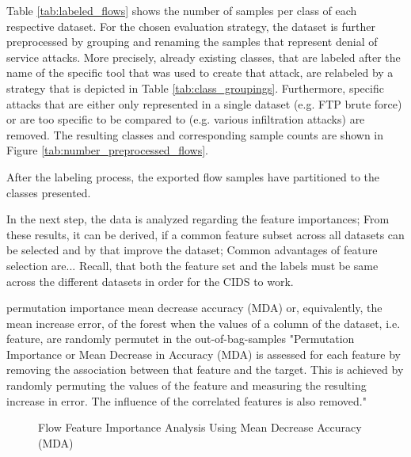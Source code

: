 \documentclass[../../main.tex]{subfiles}
\begin{document}
Table \ref{tab:labeled_flows} shows the number of samples per class of each respective dataset. For the chosen evaluation strategy, the dataset is further preprocessed by grouping and renaming the samples that represent denial of service attacks. More precisely, already existing classes, that are labeled after the name of the specific tool that was used to create that attack, are relabeled by a strategy that is depicted in Table \ref{tab:class_groupings}. Furthermore, specific attacks that are either only represented in a single dataset (e.g. FTP brute force) or are too specific to be compared to (e.g. various infiltration attacks) are removed. The resulting classes and corresponding sample counts are shown in Figure \ref{tab:number_preprocessed_flows}. 



\begin{table}
    \footnotesize
    \centering
    \setlength{\extrarowheight}{0pt}
    \addtolength{\extrarowheight}{\aboverulesep}
    \addtolength{\extrarowheight}{\belowrulesep}
    \setlength{\aboverulesep}{0pt}
    \setlength{\belowrulesep}{0pt}
    \setlength{\extrarowheight}{.1em}
     
    \caption[Preprocessed Flows]{After the labeling process, the exported flow samples have partitioned to the classes presented.}
    \label{tab:preprocessed_flows}
\end{table}


In the next step, the data is analyzed regarding the feature importances; From these results, it can be derived, if a common feature subset across all datasets can be selected and by that improve the dataset;
Common advantages of feature selection are...
Recall, that both the feature set and the labels must be same across the different datasets in order for the CIDS to work.

permutation importance \cite[125]{rforests_2014}
mean decrease accuracy (MDA) or, equivalently, the mean increase error, of the forest when the values of a column of the dataset, i.e. feature, are randomly permutet in the out-of-bag-samples
"Permutation Importance or Mean Decrease in Accuracy (MDA) is assessed for each feature by removing the association between that feature and the target. This is achieved by randomly permuting the values of the feature and measuring the resulting increase in error. The influence of the correlated features is also removed."
\begin{figure}[t!]
    \centering
    
    \caption[Flow Feature Importance Analysis]{Flow Feature Importance Analysis Using Mean Decrease Accuracy (MDA)}
    \label{fig:feature_importances}
\end{figure}
\end{document}
